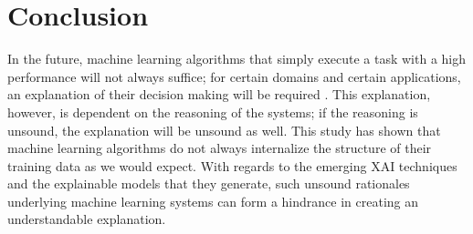 \documentclass[letterpaper]{article} %
\begin{document}
\section{Conclusion}
\noindent In the future, machine learning algorithms that simply execute a task with a high performance will not always suffice; for certain domains and certain applications, an explanation of their decision making will be required \cite{gunning2017explainable}. This explanation, however, is dependent on the reasoning of the systems; if the reasoning is unsound, the explanation will be unsound as well. This study has shown that machine learning algorithms do not always internalize the structure of their training data as we would expect. With regards to the emerging XAI techniques and the explainable models that they generate, such unsound rationales underlying machine learning systems can form a hindrance in creating an understandable explanation. 




\end{document}
